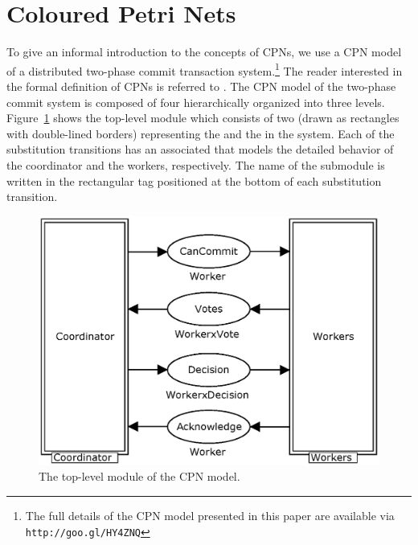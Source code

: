 \section{Coloured Petri Nets}
\label{sect:language}


To give an informal introduction to the concepts of CPNs, we use a CPN
model of a distributed two-phase commit transaction system.\footnote{The full details of the CPN model presented in this paper are available via \texttt{http://goo.gl/HY4ZNQ}}  The reader
interested in the formal definition of CPNs is referred to
\cite{newcpnbook}. The CPN model of the two-phase commit system is
composed of four  hierarchically organized into
three levels. Figure~\ref{fig:commit} shows the top-level module which
consists of two  (drawn as
rectangles with double-lined borders) representing the
 and the  in the system. Each of
the substitution transitions has an associated 
that models the detailed behavior of the coordinator and the workers,
respectively. The name of the submodule is written in the rectangular
tag positioned at the bottom of each substitution transition.

\begin{figure}[b]
\centering
\includegraphics[scale=.5]{figures/Commit.eps}
\caption{The top-level module of the CPN model.}
\label{fig:commit}
\end{figure}


